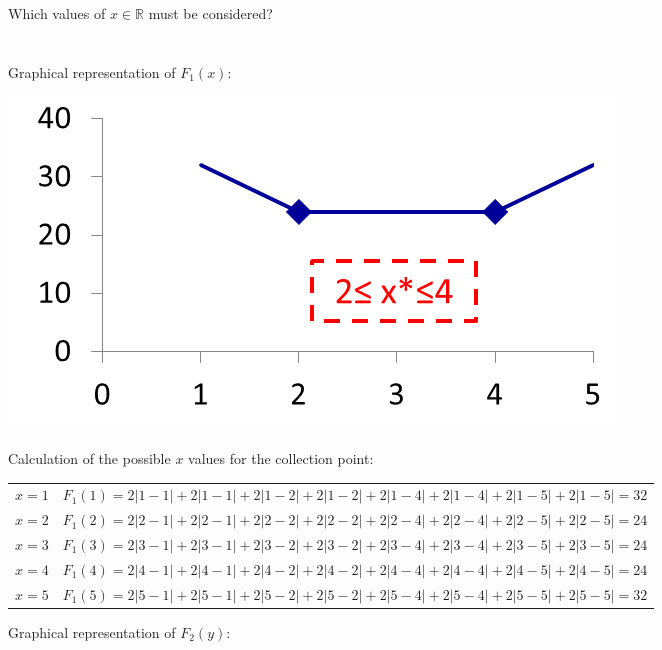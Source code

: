 \begin{enumerate}
\begin{solution}
		Which values of $x\in \mathbb{R}$ must be considered? \\
		 \\ \\
		Graphical representation of $F_1\left(x\right)$:\\
		\begin{center}
			\includegraphics[scale=0.5]{Uebungen/figures/A_1_1_Fx}
		\end{center}
		Calculation of the possible $x$ values for the collection point:\\
		\begin{tabular}{ll}
		$x=1$&$F_1(1)=2\left|1-1\right|+2\left|1-1\right|+2\left|1-2\right|+2\left|1-2\right|+2\left|1-4\right|+2\left|1-4\right|+2\left|1-5\right|+2\left|1-5\right|=32$\\
		$x=2$&$F_1(2)=2\left|2-1\right|+2\left|2-1\right|+2\left|2-2\right|+2\left|2-2\right|+2\left|2-4\right|+2\left|2-4\right|+2\left|2-5\right|+2\left|2-5\right|=24$\\
		$x=3$&$F_1(3)=2\left|3-1\right|+2\left|3-1\right|+2\left|3-2\right|+2\left|3-2\right|+2\left|3-4\right|+2\left|3-4\right|+2\left|3-5\right|+2\left|3-5\right|=24$\\
		$x=4$&$F_1(4)=2\left|4-1\right|+2\left|4-1\right|+2\left|4-2\right|+2\left|4-2\right|+2\left|4-4\right|+2\left|4-4\right|+2\left|4-5\right|+2\left|4-5\right|=24$\\
		$x=5$&$F_1(5)=2\left|5-1\right|+2\left|5-1\right|+2\left|5-2\right|+2\left|5-2\right|+2\left|5-4\right|+2\left|5-4\right|+2\left|5-5\right|+2\left|5-5\right|=32$\\
		\end{tabular}
	\vspace{1cm}
		
		Graphical representation of $F_2\left(y\right)$:\\
		

\end{solution}
\end{enumerate}
